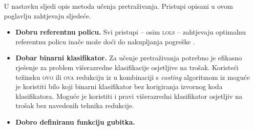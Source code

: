 U nastavku sljedi opis metoda učenja pretraživanja. Pristupi opisani u ovom
poglavlju zahtjevaju sljedeće.

\begin{itemize}
\item \textbf{Dobru referentnu policu.} Svi pristupi -- osim \textsc{lols} --
zahtjevaju optimalnu referentnu policu inače može doći do nakupljanja pogreške
.
\item \textbf{Dobar binarni klasifikator.} Za učenje pretraživanja potrebno je
efikasno rješenje za problem višerazredne klasifikacije osjetljive na trošak.
Koristeći težinsku \textsc{ovo} ili \textsc{ova}  redukciju iz \citep{beygelzimer2005weighted,
beygelzimer2005error} u kombinaciji s \textit{costing} algoritmom iz
\citep{zadrozny2003cost} moguće je koristiti bilo koji binarni klasifikator bez
korigiranja izvornog koda klasifikatora. Moguće je koristiti i pravi
višerazredni klasifikator osjetljiv na trošak bez navedenih tehnika redukcije.
\item \textbf{Dobro definiranu funkciju gubitka.}
\end{itemize}
